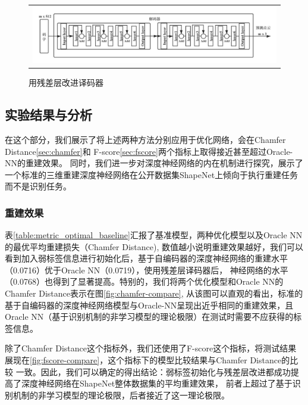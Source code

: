 \documentclass[bachelor, nocolorlinks, printoneside]{seuthesis} %
\begin{document}
\begin{Main}
\begin{itemize}
\begin{figure}
    \centering
    \begin{tabular}{c@{}}
    \includegraphics[width=0.99\columnwidth]{figs/model/resnet_decoder.png}
    \end{tabular}
    \caption{用残差层改进译码器}
    \label{fig:resnet_decoder}
\end{figure}

\end{itemize}
\FloatBarrier
\subsection{实验结果与分析}
\label{sec:shapenet_result}
在这个部分，我们展示了将上述两种方法分别应用于优化网络，会在Chamfer Distance\ref{sec:chamfer}和 F-score\ref{sec:fscore}两个指标上取得接近甚至超过Oracle-NN的重建效果。
同时，我们进一步对深度神经网络的内在机制进行探究，展示了一个标准的三维重建深度神经网络在公开数据集ShapeNet上倾向于执行重建任务而不是识别任务。

\subsubsection{重建效果}
表\ref{table:metric_optimal_baseline}汇报了基准模型，两种优化模型以及Oracle NN的最优平均重建损失（Chamfer Distance),
数值越小说明重建效果越好，我们可以看到加入弱标签信息进行初始化后，基于自编码器的深度神经网络的重建水平（0.0716）优于Oracle NN（0.0719），使用残差层译码器后，
神经网络的水平（0.0768）也得到了显著提高。特别的，我们将两个优化模型和Oracle NN的Chamfer Distance表示在图\ref{fig:chamfer-compare},
从该图可以直观的看出，标准的基于自编码器的深度神经网络模型与Oracle-NN呈现出近乎相同的重建效果，且Oracle NN（基于识别机制的非学习模型的理论极限）在测试时需要不应获得的标签信息。

除了Chamfer Distance这个指标外，我们还使用了F-score这个指标，将测试结果展现在\ref{fig:fscore-compare}，这个指标下的模型比较结果与Chamfer Distance的比较
一致。因此，我们可以确定的得出结论：弱标签初始化与残差层改进都成功提高了深度神经网络在ShapeNet整体数据集的平均重建效果，
前者上超过了基于识别机制的非学习模型的理论极限，后者接近了这一理论极限。


\end{Main}
\end{document}
